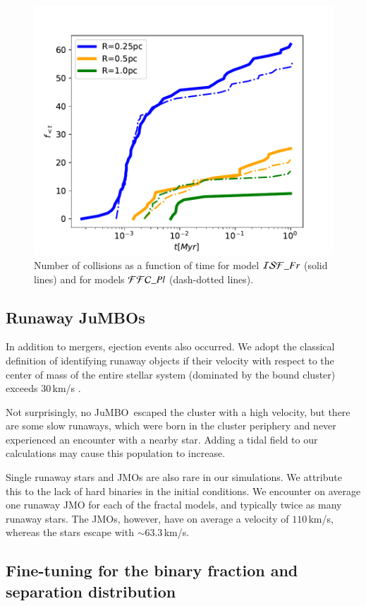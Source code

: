 \documentclass[submission,phys]{lib/SciPost}
\newcommand{\jumbo}{\mbox{JuMBO}}
\newcommand{\jumbos}{\mbox{JuMBOs}}
\begin{document}
\begin{figure}
\centering
    \includegraphics[width=0.75\columnwidth]{figures/fig_collision_evolution_ISF_Fr.pdf
    }
        \caption{Number of collisions as a function of time for model
          ${\cal ISF}\_Fr$ (solid lines) and for models ${\cal
            FFC}\_Pl$ (dash-dotted lines).}
         \label{Fig:collision_evolution_ISF_Fr}
\end{figure}

\subsection{Runaway \jumbos}

In addition to mergers, ejection events also occurred.  We adopt the
classical definition of identifying runaway objects if their velocity
with respect to the center of mass of the entire stellar system
(dominated by the bound cluster) exceeds 30\,km/s
\cite{1961BAN....15..265B}.

Not surprisingly, no \jumbo\, escaped the cluster with a high
velocity, but there are some slow runaways, which were born in the
cluster periphery and never experienced an encounter with a nearby
star. Adding a tidal field to our calculations may cause this
population to increase.

Single runaway stars and JMOs are also rare in our simulations. We
attribute this to the lack of hard binaries in the initial
conditions.  We encounter on average one runaway JMO for each of the
fractal models, and typically twice as many runaway stars.  The JMOs,
however, have on average a velocity of $110$\,km/s, whereas the stars
escape with $\sim 63.3$\,km/s.

\subsection{Fine-tuning for the binary fraction and separation distribution}\label{sect:finetuningbinary_fraction}
\end{document}
